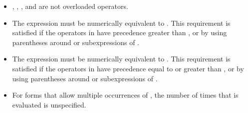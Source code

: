 \begin{ccppspecific}
\begin{itemize}
\item {}, \code{=}, \code{++}, and \code{--} are not overloaded operators.

\item The expression    must be numerically equivalent to
  . This
requirement is satisfied if the operators in  have precedence greater than ,
or by using parentheses around  or subexpressions of .

\item The expression    must be numerically equivalent to
  . This
requirement is satisfied if the operators in  have precedence equal to or greater
than , or by using parentheses around  or subexpressions of .

\item For forms that allow multiple occurrences of , the number of times that  is
evaluated is unspecified.
\end{itemize}

\end{ccppspecific}

